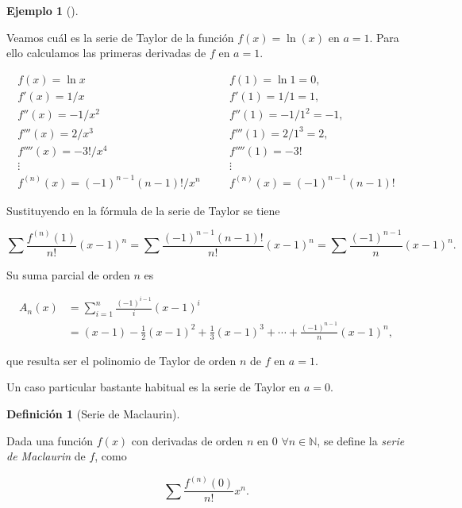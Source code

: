 \documentclass[
  a4paper,
]{scrreport}
\theoremstyle{definition}
\newtheorem{example}{Ejemplo}[chapter]
\theoremstyle{plain}
\theoremstyle{definition}
\newtheorem{definition}{Definición}[chapter]
\theoremstyle{definition}
\theoremstyle{plain}
\theoremstyle{plain}
\theoremstyle{remark}
\begin{document}
\begin{example}[]\protect\hypertarget{exm-serie-taylor}{}\label{exm-serie-taylor}

Veamos cuál es la serie de Taylor de la función \(f(x)=\ln(x)\) en
\(a=1\). Para ello calculamos las primeras derivadas de \(f\) en
\(a=1\).

\[
\begin{array}{lll}
f(x)=\ln x & \quad & f(1)=\ln 1 =0,\\
f'(x)=1/x & & f'(1)=1/1=1,\\
f''(x)=-1/x^2 & & f''(1)=-1/1^2=-1,\\
f'''(x)=2/x^3 & & f'''(1)=2/1^3=2,\\
f''''(x)=-3!/x^4 & & f''''(1) = -3!\\
\vdots & & \vdots\\
f^{(n)}(x) = (-1)^{n-1}(n-1)!/x^n & & f^{(n)}(x) = (-1)^{n-1}(n-1)!
\end{array}
\]

Sustituyendo en la fórmula de la serie de Taylor se tiene

\[
\sum \frac{f^{(n)}(1)}{n!}(x-1)^n = \sum \frac{(-1)^{n-1}(n-1)!}{n!} (x-1)^n = \sum \frac{(-1)^{n-1}}{n}(x-1)^n.
\]

Su suma parcial de orden \(n\) es

\begin{align*}
A_n(x) &= \sum_{i=1}^n \frac{(-1)^{i-1}}{i}(x-1)^i\\ 
&= (x-1)-\frac{1}{2}(x-1)^2 +\frac{1}{3}(x-1)^3+ \cdots +\frac{(-1)^{n-1}}{n}(x-1)^n,
\end{align*}

que resulta ser el polinomio de Taylor de orden \(n\) de \(f\) en
\(a=1\).

\end{example}

Un caso particular bastante habitual es la serie de Taylor en \(a=0\).

\begin{definition}[Serie de
Maclaurin]\protect\hypertarget{def-serie-maclaurin}{}\label{def-serie-maclaurin}

Dada una función \(f(x)\) con derivadas de orden \(n\) en \(0\)
\(\forall n\in\mathbb{N}\), se define la \emph{serie de Maclaurin} de
\(f\), como

\[
\sum \frac{f^{(n)}(0)}{n!}x^n.
\]

\end{definition}
\end{document}
